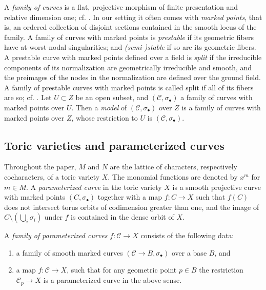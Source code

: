 \documentclass[11pt,reqno]{amsart}
\numberwithin{equation}{section}
\theoremstyle{definition}
\def\:{\colon}
\newcommand{\cC}{{\mathcal{C}}}
\theoremstyle{remark}
\begin{document}
A \emph{family of curves} is a flat, projective morphism of finite presentation and relative dimension one; cf. \cite[\S~2.1]{CHT22}. In our setting it often comes with \emph{marked points}, that is, an ordered collection of disjoint sections contained in the smooth locus of the family. A family of curves with marked points is \emph{prestable} if its geometric fibers have at-worst-nodal singularities; and 
\emph{(semi-)stable} if so are its geometric fibers. A prestable curve with marked points defined over a field is \emph{split} if the irreducible components of its normalization are geometrically irreducible and smooth, and the preimages of the nodes in the normalization are defined over the ground field. A family of prestable curves with marked points is called split if all of its fibers are so; cf. \cite[\S~2.22]{dJ96}.  
Let $U \subset Z$ be an open subset, and $(\cC, \sigma_\bullet)$ a family of curves with marked points over $U$. Then a \emph{model} of $(\cC, \sigma_\bullet)$ over $Z$ is a family of curves with marked points over $Z$, whose restriction to $U$ is $(\cC, \sigma_\bullet)$.

\subsection{Toric varieties and parameterized curves}\label{sec:families of parcur}
Throughout the paper, $M$ and $N$ are the lattice of characters, respectively cocharacters, of a toric variety $X$. The monomial functions are denoted by $x^m$ for $m\in M$. 
A \emph{para\-meterized curve} in the toric variety $X$ is a smooth projective curve with marked points $(C,\sigma_\bullet)$ together with a map $f\: C \to X$ such that $f(C)$ does not intersect torus orbits of codimension greater than one, and the image of $C \setminus \left( \bigcup_i \sigma_i \right)$ under $f$ is contained in the dense orbit of $X$.

A \emph{family of parameterized curves} $f\colon \cC \rightarrow X$ consists of the following data: 
	\begin{enumerate}
	    \item a family of smooth marked curves $(\cC \to B, \sigma_{\bullet})$ over a base $B$, and
	    \item a map $f\colon \cC \rightarrow X$, such that for any geometric point $p \in B$ the restriction $\cC_p \to X$ is a parameterized curve in the above sense. 
	\end{enumerate}
\end{document}
